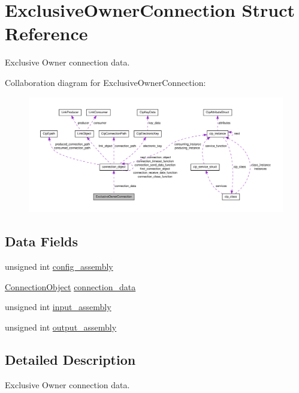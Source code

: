 \hypertarget{structExclusiveOwnerConnection}{\section{\-Exclusive\-Owner\-Connection \-Struct \-Reference}
\label{d7/d95/structExclusiveOwnerConnection}
}


\-Exclusive \-Owner connection data.  




\-Collaboration diagram for \-Exclusive\-Owner\-Connection\-:
\nopagebreak
\begin{figure}[H]
\begin{center}
\leavevmode
\includegraphics[width=350pt]{dc/ded/structExclusiveOwnerConnection__coll__graph}
\end{center}
\end{figure}
\subsection*{\-Data \-Fields}
\begin{DoxyCompactItemize}
\item 
unsigned int \hyperlink{structExclusiveOwnerConnection_a44eec9298e01ff013629d3ff2133f12c}{config\-\_\-assembly}
\item 
\hyperlink{cipconnectionmanager_8h_a705e78f4613ecabcb6388951b73c4700}{\-Connection\-Object} \hyperlink{structExclusiveOwnerConnection_a02eadcfece1cc9b42d0559f21857bb17}{connection\-\_\-data}
\item 
unsigned int \hyperlink{structExclusiveOwnerConnection_a69ee3199554492e4b1b8af8c69e65e5f}{input\-\_\-assembly}
\item 
unsigned int \hyperlink{structExclusiveOwnerConnection_af87afe8d455fcff291043a1a3b1c9f64}{output\-\_\-assembly}
\end{DoxyCompactItemize}


\subsection{\-Detailed \-Description}
\-Exclusive \-Owner connection data. 

